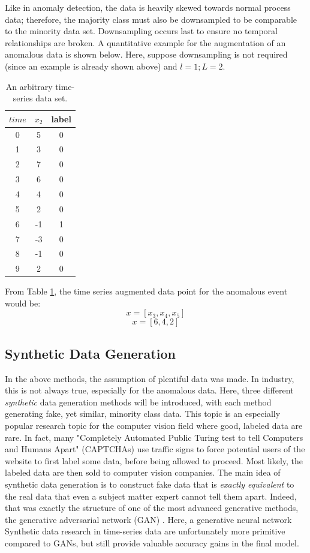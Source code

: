 Like in anomaly detection, the data is heavily skewed towards normal process data; therefore, the majority class must also be downsampled to be comparable to the minority data set. Downsampling occurs last to ensure no temporal relationships are broken. A quantitative example for the augmentation of an anomalous data is shown below.  Here, suppose downsampling is not required (since an example is already shown above) and $l = 1; L = 2$.

\begin{table}[H]
    \centering
    \begin{tabular}{ c | c | c }
        $time$ & $x_2$ & label \\
        \hline
        0 & 5 & 0 \\
        1 & 3 & 0 \\
        2 & 7 & 0 \\
        3 & 6 & 0 \\
        4 & 4 & 0 \\
        5 & 2 & 0 \\
        6 & -1 & 1 \\
        7 & -3 & 0 \\
        8 & -1 & 0 \\
        9 & 2 & 0 \\
    \end{tabular}
    \caption{An arbitrary time-series data set.}
    \label{tab:03aug}
\end{table}

From Table \ref{tab:03aug}, the time series augmented data point for the anomalous event would be:
$$x = [x_3, x_4, x_5]$$
$$x = [6, 4, 2]$$


\subsection{Synthetic Data Generation}
In the above methods, the assumption of plentiful data was made.  In industry, this is not always true, especially for the anomalous data.  Here, three different \textit{synthetic} data generation methods will be introduced, with each method generating fake, yet similar, minority class data.  This topic is an especially popular research topic for the computer vision field where good, labeled data are rare. In fact, many "Completely Automated Public Turing test to tell Computers and Humans Apart" (CAPTCHAs) use traffic signs to force potential users of the website to first label some data, before being allowed to proceed. Most likely, the labeled data are then sold to computer vision companies. The main idea of synthetic data generation is to construct fake data that is \textit{exactly equivalent} to the real data that even a subject matter expert cannot tell them apart.  Indeed, that was exactly the structure of one of the most advanced generative methods, the generative adversarial network (GAN) \cite{gan}. Here, a generative neural network Synthetic data research in time-series data are unfortunately more primitive compared to GANs, but still provide valuable accuracy gains in the final model. 

